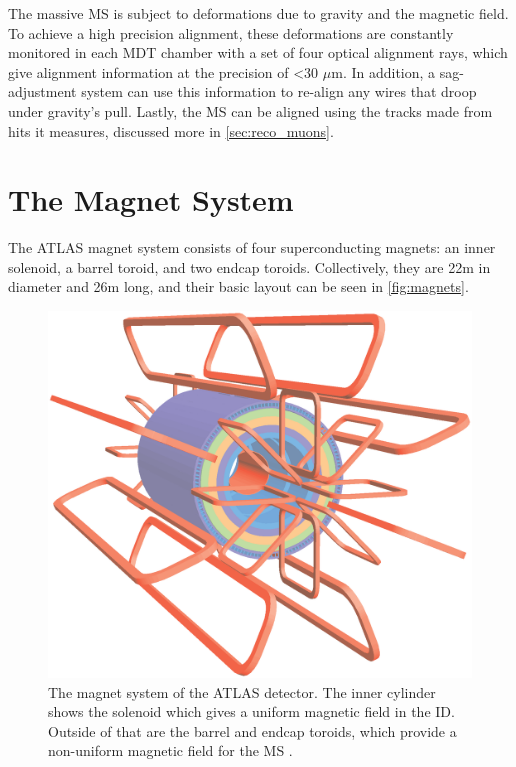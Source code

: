 The massive \ac{MS} is subject to deformations due to gravity and the magnetic field. To achieve a high precision alignment, these deformations are constantly monitored in each \ac{MDT} chamber with a set of four optical alignment rays, which give alignment information at the precision of <30 $\mu$m. In addition, a sag-adjustment system can use this information to re-align any wires that droop under gravity's pull. Lastly, the \ac{MS} can be aligned using the tracks made from hits it measures, discussed more in \autoref{sec:reco_muons}.

\section{The Magnet System}
\label{sec:magnets}

The \ac{ATLAS} magnet system consists of four superconducting magnets: an inner solenoid, a barrel toroid, and two endcap toroids. Collectively, they are 22m in diameter and 26m long, and their basic layout can be seen in \autoref{fig:magnets}.

\begin{centering}
\begin{figure}[!htb]
\myfloatalign
\includegraphics[width=.90\linewidth]{figures/atlas/ATLcoilGeom.eps}
\caption{The magnet system of the \ac{ATLAS} detector. The inner cylinder shows the solenoid which gives a uniform magnetic field in the \ac{ID}. Outside of that are the barrel and endcap toroids, which provide a non-uniform magnetic field for the \ac{MS} \cite{PERF-2007-01}.}
\label{fig:magnets}
\end{figure}
\end{centering}


